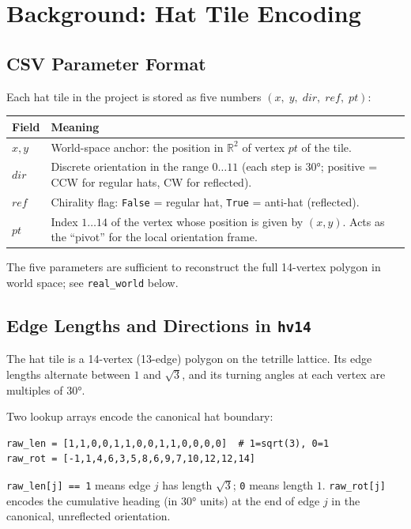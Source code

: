 \documentclass[10pt,a4paper]{article}
\let\polysection\section
\renewcommand\section{\needspace{0.16\textheight}\polysection}
\let\polysubsection\subsection
\renewcommand\subsection{\needspace{0.12\textheight}\polysubsection}
\newcommand{\code}[1]{\texttt{\small #1}}
\begin{document}
\section{Background: Hat Tile Encoding}

\subsection{CSV Parameter Format}

Each hat tile in the project is stored as five numbers
$(x,\; y,\; \mathit{dir},\; \mathit{ref},\; \mathit{pt})$:

\begin{center}
\begin{tabular}{@{}lp{10cm}@{}}
\toprule
\textbf{Field} & \textbf{Meaning} \\
\midrule
$x, y$        & World-space anchor: the position in $\mathbb{R}^2$ of
                 vertex $\mathit{pt}$ of the tile. \\
$\mathit{dir}$ & Discrete orientation in the range $0\ldots 11$
                 (each step is $30°$; positive = CCW for regular hats,
                  CW for reflected). \\
$\mathit{ref}$ & Chirality flag: \texttt{False} = regular hat,
                 \texttt{True} = anti-hat (reflected). \\
$\mathit{pt}$  & Index $1\ldots 14$ of the vertex whose position
                 is given by $(x, y)$.  Acts as the ``pivot'' for the
                 local orientation frame. \\
\bottomrule
\end{tabular}
\end{center}

\noindent The five parameters are sufficient to reconstruct the full 14-vertex
polygon in world space; see \code{real\_world} below.

\subsection{Edge Lengths and Directions in \code{hv14}}

The hat tile is a 14-vertex (13-edge) polygon on the tetrille lattice.  Its
edge lengths alternate between $1$ and $\sqrt{3}$, and its turning angles at
each vertex are multiples of $30°$.

Two lookup arrays encode the canonical hat boundary:
\begin{verbatim}
raw_len = [1,1,0,0,1,1,0,0,1,1,0,0,0,0]  # 1=sqrt(3), 0=1
raw_rot = [-1,1,4,6,3,5,8,6,9,7,10,12,12,14]
\end{verbatim}
\code{raw\_len[j] == 1} means edge $j$ has length $\sqrt{3}$; \code{0} means
length $1$.  \code{raw\_rot[j]} encodes the cumulative heading (in $30°$ units)
at the end of edge $j$ in the canonical, unreflected orientation.
\end{document}
